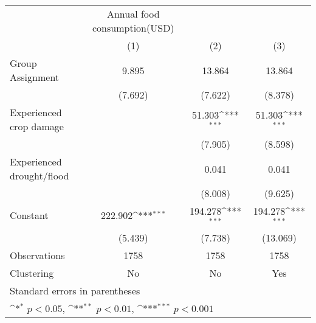 {
\def\sym#1{\ifmmode^{#1}\else\(^{#1}\)\fi}
\begin{tabular}{l*{3}{c}}
\hline\hline
                    &Annual food consumption(USD)                                     \\
                    &\multicolumn{1}{c}{(1)}         &\multicolumn{1}{c}{(2)}         &\multicolumn{1}{c}{(3)}         \\
\hline
Group Assignment    &       9.895         &      13.864         &      13.864         \\
                    &     (7.692)         &     (7.622)         &     (8.378)         \\
[1em]
Experienced crop damage&                     &      51.303\sym{***}&      51.303\sym{***}\\
                    &                     &     (7.905)         &     (8.598)         \\
[1em]
Experienced drought/flood&                     &       0.041         &       0.041         \\
                    &                     &     (8.008)         &     (9.625)         \\
[1em]
Constant            &     222.902\sym{***}&     194.278\sym{***}&     194.278\sym{***}\\
                    &     (5.439)         &     (7.738)         &    (13.069)         \\
\hline
Observations        &        1758         &        1758         &        1758         \\
Clustering          &          No         &          No         &         Yes         \\
\hline\hline
\multicolumn{4}{l}{\footnotesize Standard errors in parentheses}\\
\multicolumn{4}{l}{\footnotesize \sym{*} \(p<0.05\), \sym{**} \(p<0.01\), \sym{***} \(p<0.001\)}\\
\end{tabular}
}
